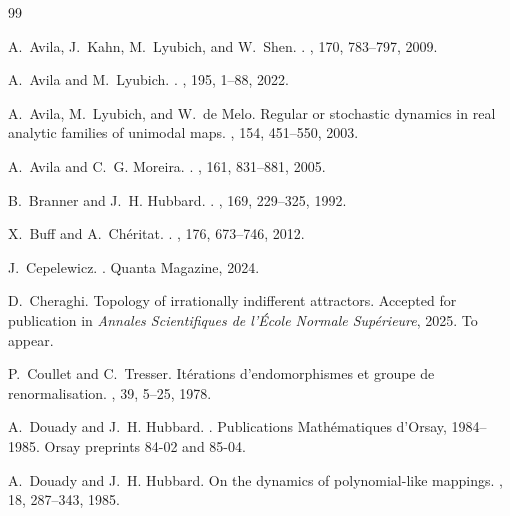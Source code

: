 \documentclass[twoside,leqno]{article}
\theoremstyle{plain}
\begin{document}


%
%

\begin{thebibliography}{99}


A.~Avila, J.~Kahn, M.~Lyubich, and W.~Shen.
.
, 170, 783--797, 2009.


A.~Avila and M.~Lyubich.
.
, 195, 1--88, 2022.

A.~Avila, M.~Lyubich, and W.~de Melo.
\newblock Regular or stochastic dynamics in real analytic families of unimodal maps.
, 154, 451--550, 2003.

A.~Avila and C.~G. Moreira.
.
, 161, 831--881, 2005.

B.~Branner and J.~H. Hubbard.
.
, 169, 229--325, 1992.

X.~Buff and A.~Ch{\'e}ritat.
.
, 176, 673--746, 2012.

J.~Cepelewicz.
.
\newblock Quanta Magazine, 2024.

D.~Cheraghi.
\newblock Topology of irrationally indifferent attractors.
\newblock Accepted for publication in {\em Annales Scientifiques de l'\'Ecole Normale Sup\'erieure}, 2025. To appear.

P.~Coullet and C.~Tresser.
\newblock It{\'e}rations d’endomorphismes et groupe de renormalisation.
, 39, 5--25, 1978.


A.~Douady and J.~H. Hubbard.
.
\newblock Publications Math{\'e}matiques d'Orsay, 1984--1985. Orsay preprints 84-02 and 85-04.

A.~Douady and J.~H. Hubbard.
\newblock On the dynamics of polynomial-like mappings.
, 18, 287--343, 1985.



\end{thebibliography}
\end{document}
